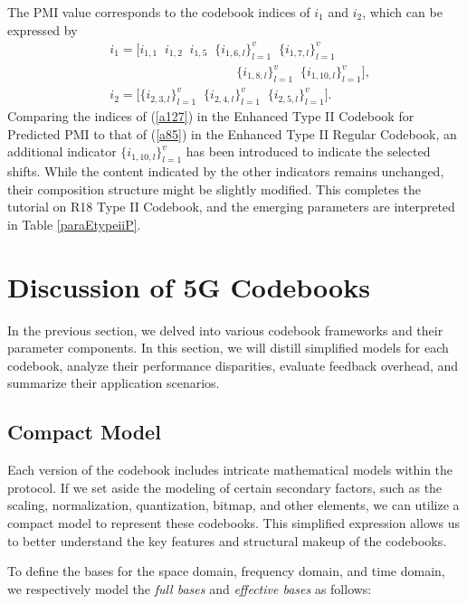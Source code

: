 \documentclass[lettersize,journal]{IEEEtran}
\begin{document}
The PMI value corresponds to the codebook indices of $i_1$ and $i_2$, which can be expressed by 
\begin{equation}\label{a127}
\begin{aligned}
&{i_1} = \Big[ i_{1,1}\;\;{i_{1,2}}\;\;i_{1,5}\;\; \{ {i_{1,6,l}}\} _{l = 1}^v\;\;\{ {i_{1,7,l}}\} _{l = 1}^v \\
&\qquad\qquad\qquad\qquad \qquad \{ {i_{1,8,l}}\} _{l = 1}^v \;\;\{ {i_{1,10,l}}\} _{l = 1}^v\Big],\\
&{i_2} = \Big[ \{{{i_{2,3,l}}\} _{l = 1}^v\;\;\{ {i_{2,4,l}}\} _{l = 1}^v\;\;\{ {i_{2,5,l}}\} _{l = 1}^v} \Big].
\end{aligned}
\end{equation}
Comparing the indices of (\ref{a127}) in the Enhanced Type II Codebook for Predicted PMI to that of (\ref{a85}) in the Enhanced Type II Regular Codebook, an additional indicator $\{ {i_{1,10,l}}\} _{l = 1}^v$ has been introduced to indicate the selected shifts. While the content indicated by the other indicators remains unchanged, their composition structure might be slightly modified. This completes the tutorial on R18 Type II Codebook, and the emerging parameters are interpreted in Table \ref{paraEtypeiiP}.



\section{Discussion of 5G Codebooks}\label{comparisonandapp}
In the previous section, we delved into various codebook frameworks and their parameter components. In this section, we will distill simplified models for each codebook, analyze their performance disparities, evaluate feedback overhead, and summarize their application scenarios.

\subsection{Compact Model}

 Each version of the codebook includes intricate mathematical models within the protocol. If we set aside the modeling of certain secondary factors, such as the scaling, normalization, quantization, bitmap, and other elements, we can utilize a compact model to represent these codebooks. This simplified expression allows us to better understand the key features and structural makeup of the codebooks.

To define the bases for the space domain, frequency domain, and time domain, we respectively model the \emph{full bases} and \emph{effective bases} as follows:
\end{document}

